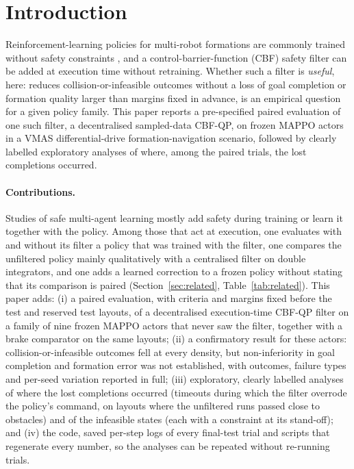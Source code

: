 \documentclass[11pt]{article}
\begin{document}
\section{Introduction}
Reinforcement-learning policies for multi-robot formations are commonly trained without safety
constraints \cite{brunke2022}, and a control-barrier-function (CBF) safety filter \cite{ames2019}
can be added at execution time without retraining. Whether such a filter is \emph{useful}, here: reduces
collision-or-infeasible outcomes without a loss of goal completion or formation quality larger than
margins fixed in advance, is an empirical question for a given policy family. This paper reports a pre-specified paired evaluation
of one such filter, a decentralised sampled-data CBF-QP, on frozen MAPPO \cite{yu2022mappo} actors
in a VMAS \cite{bettini2022vmas} differential-drive formation-navigation scenario, followed by clearly
labelled exploratory analyses of where, among the paired trials, the lost completions occurred.

\paragraph{Contributions.} Studies of safe multi-agent learning mostly add safety during training or
learn it together with the policy. Among those that act at execution, one evaluates with and without
its filter a policy that was trained with the filter, one compares the unfiltered policy mainly
qualitatively with a centralised filter on double integrators, and one adds a learned correction to a
frozen policy without stating that its comparison is paired (Section~\ref{sec:related},
Table~\ref{tab:related}). This paper adds:
(i) a paired evaluation, with criteria and margins fixed before the test and reserved test layouts,
of a decentralised execution-time CBF-QP filter on a family of nine frozen MAPPO actors that never saw
the filter, together with a brake comparator on the same layouts;
(ii) a confirmatory result for these actors: collision-or-infeasible outcomes fell at every density,
but non-inferiority in goal completion and formation error was not established, with outcomes,
failure types and per-seed variation reported in full;
(iii) exploratory, clearly labelled analyses of where the lost completions occurred (timeouts during
which the filter overrode the policy's command, on layouts where the unfiltered runs passed close to
obstacles) and of the infeasible states (each with a constraint at its stand-off); and
(iv) the code, saved per-step logs of every final-test trial and scripts that regenerate every number,
so the analyses can be repeated without re-running trials.
\end{document}
